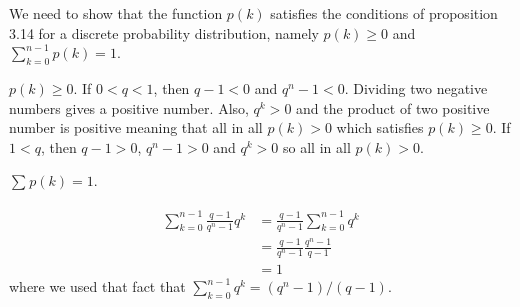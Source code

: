 
We need to show that the function $ p(k)$ satisfies the conditions of proposition 3.14 for a
discrete probability distribution, namely $ p(k) \geq 0$ and $ \sum_{k=0}^{n-1} p(k) = 1$. 

\textbf{$ p(k) \geq 0$}. If $ 0 < q < 1$, then $ q -1 < 0$ and $ q^{n} -1 < 0$. Dividing two
negative numbers gives a positive number. Also, $ q^{k} > 0$ and the product of two positive number
is positive meaning that all in all $ p(k) > 0$ which satisfies $ p(k) \geq 0$. If $ 1 < q$, then $
q-1 > 0	$, $ q^{n} -1 > 0 $ and $ q^{k} > 0$ so all in all $ p(k) > 0$.

\textbf{ $ \sum_{}^{} p(k) = 1$}. 

\begin{align*}
    \sum_{k=0}^{n-1} \frac{q-1}{q^{n} -1} q^{k} &= \frac{q-1}{q^{n} -1 } \sum_{k=0}^{n-1} q^{k}	\\
						&= \frac{q-1}{q^{n} -1} \frac{q^{n} -1}{q-1} \\
						&= 1
\end{align*}
where we used that fact that $ \sum_{k=0}^{n-1} q^{k} = (q^{n} -1 )/(q-1) $. 
